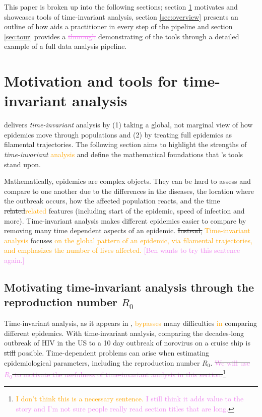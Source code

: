 \documentclass[
  shortnames]{jss}
\begin{document}
This paper is broken up into the following sections; section
\ref{sec:time-invariant} motivates and showcases tools of time-invariant
analysis, section \ref{sec:overview} presents an outline of how
 aids a practitioner in every step of the pipeline and
section \ref{sec:tour} provides a \textcolor{violet}{\sout{thorough}}
demonstrating of the tools through a detailed example of a full data
analysis pipeline.

\section[Time-invariant]{Motivation and tools for time-invariant
analysis}\label{sec:time-invariant}

 delivers \textit{time-invariant} analysis by (1) taking
a global, not marginal view of how epidemics move through populations
and (2) by treating full epidemics as filamental trajectories. The
following section aims to highlight the strengths of
\textit{time-invariant} \textcolor{orange}{analysis} and define the
mathematical foundations that 's tools stand upon.

Mathematically, epidemics are complex objects. They can be hard to
assess and compare to one another due to the differences in the
diseases, the location where the outbreak occurs, how the affected
population reacts, and the time
\sout{related}\textcolor{orange}{related} features (including start of
the epidemic, speed of infection and more). Time-invariant analysis
makes different epidemics easier to compare by removing many time
dependent aspects of an epidemic. \sout{Instead,}
\textcolor{orange}{Time-invariant analysis} focuses
\textcolor{orange}{on the global pattern of an epidemic, via filamental trajectories,  and emphasizes the number of lives affected.}
\textcolor{violet}{[Ben wants to try this sentence again.]}

\subsection[motivating through R0]{Motivating time-invariant analysis
through the reproduction number \(R_0\)}\label{sec:r0}

Time-invariant analysis, as it appears in ,
\textcolor{orange}{bypasses} many difficulties \textcolor{orange}{in}
comparing different epidemics. With time-invariant analysis, comparing
the decades-long outbreak of HIV in the US to a 10 day outbreak of
norovirus on a cruise ship is \sout{still} possible. Time-dependent
problems can arise when estimating epidemiological parameters, including
the reproduction number \(R_0\).
\sout{\textcolor{violet}{We will use $R_0$ to motivate the usefulness of time-invariant analysis in this section.}}\footnote{\textcolor{orange}{I don't think this is a necessary sentence.}
  \textcolor{violet}{I still think it adds value to the story and I'm not sure people really read section titles that are long.}}
\end{document}
